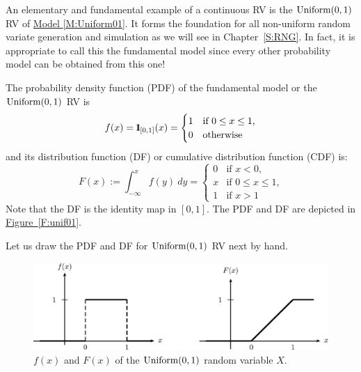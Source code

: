 An elementary and fundamental example of a continuous RV is the $\mbox{{\rm Uniform}}(0,1)$ RV of \hyperref[M:Uniform01]{Model \ref*{M:Uniform01}}.  It forms the foundation for all non-uniform random variate generation and simulation as we will see in Chapter~\ref{S:RNG}.  
In fact, it is appropriate to call this the fundamental model since every other probability model can be obtained from this one!

\begin{model}\label{M:Uniform01}
The probability density function (PDF) of the fundamental model or the $\mbox{{\rm Uniform}}(0,1)$ RV is
\begin{equation}\label{E:Uniform01pdf}
f(x) = {1}\mspace{-11 mu}{1}_{[0,1]}(x) = 
\begin{cases}
1 & \text{if $0 \leq x \leq 1$,}\\
0 & \text{otherwise}
\end{cases}
\end{equation}
and its distribution function (DF) or cumulative distribution function (CDF) is:
\begin{equation}\label{E:Uniform01DF}
F(x) := \int_{- \infty}^x f(y) \ dy =
\begin{cases}
0 & \text{if $x < 0$,} \\
x & \text{if $0 \leq x \leq 1$,}\\
1 & \text{if $x > 1$} 
\end{cases}
\end{equation}
Note that the DF is the identity map in $[0,1]$.  The PDF and DF are depicted in \hyperref[F:unif01]{Figure~\ref*{F:unif01}}.
\end{model}

Let us draw the PDF and DF for $\mbox{{\rm Uniform}}(0,1)$ RV next by hand.

\begin{figure}[htbp]
\begin{center}
\includegraphics{pstricks/unif01fF}
\caption{$f(x)$ and $F(x)$ of the $\mbox{{\rm Uniform}}(0,1)$ random variable $X$.}
\end{center}
\end{figure}

